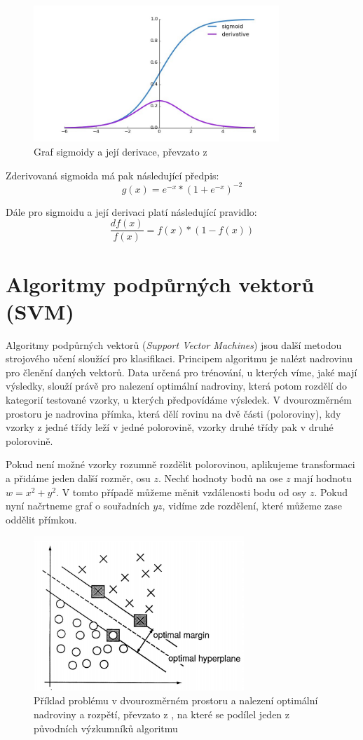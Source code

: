 \begin{figure}[!htbp]
    \centering
    \includegraphics[width=350px]{obrazky-figures/sigmoid.jpeg}
    \caption{Graf sigmoidy a její derivace, převzato z \cite{MediumDeepLearning}}
\end{figure}

Zderivovaná sigmoida má pak následující předpis:
$$g(x)=e^{-x}*{(1+e^{-x})}^{-2}$$

Dále pro sigmoidu a její derivaci platí následující pravidlo:
$$\frac{df(x)}{f(x)} = f(x)*(1-f(x))$$

\section{Algoritmy podpůrných vektorů (SVM)}
Algoritmy podpůrných vektorů (\textit{Support Vector Machines}) jsou další metodou strojového učení sloužící pro klasifikaci. Principem algoritmu je nalézt nadrovinu pro členění daných vektorů. Data určená pro trénování, u kterých víme, jaké mají výsledky, slouží právě pro nalezení optimální nadroviny, která potom rozdělí do kategorií testované vzorky, u kterých předpovídáme výsledek. V dvourozměrném prostoru je nadrovina přímka, která dělí rovinu na dvě části (poloroviny), kdy vzorky z jedné třídy leží v jedné polorovině, vzorky druhé třídy pak v druhé polorovině. 

Pokud není možné vzorky rozumně rozdělit polorovinou, aplikujeme transformaci a přidáme jeden další rozměr, osu $z$. Nechť hodnoty bodů na ose $z$ mají hodnotu $w = x^2 + y^2$. V tomto případě můžeme měnit vzdálenosti bodu od osy $z$. Pokud nyní načrtneme graf o souřadních $yz$, vidíme zde rozdělení, které můžeme zase oddělit přímkou. 

\begin{figure}[!htbp]
    \centering
    \includegraphics[width=300px]{obrazky-figures/svmVapnik.png}
    \caption{Příklad problému v dvourozměrném prostoru a nalezení optimální nadroviny a rozpětí, převzato z \cite{VapnikSVM}, na které se podílel jeden z původních výzkumníků algoritmu}
\end{figure}

